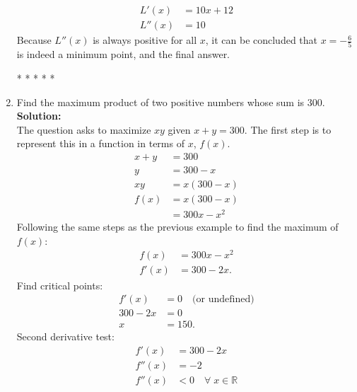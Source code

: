 \documentclass[12pt]{article}
\begin{document}
\begin{enumerate}
\begin{align*}
                        L'(x) &= 10x + 12 \\
                        L''(x) &= 10
                    \end{align*}
                    Because $L''(x)$ is always positive for all $x$, it can be concluded that $x=-\frac{6}{5}$ is indeed a minimum point, and the final answer.
                    \begin{center}
                        * * * * *
                    \end{center}
                \item Find the maximum product of two positive numbers whose sum is $300$.
                \newline \newline
                    \textbf{Solution:}
                    \\ The question asks to maximize $xy$ given $x+y=300$. The first step is to represent this in a function in terms of $x$, $f(x)$.
                    \begin{align*}
                        x+y &= 300 \\
                        y &= 300 - x \\
                        xy &= x(300-x) \\
                        f(x) &= x(300-x) \\
                        &= 300x - x^2
                    \end{align*}
                    Following the same steps as the previous example to find the maximum of $f(x)$:
                    \begin{align*}
                        f(x) &= 300x - x^2 \\
                        f'(x) &= 300 - 2x.
                    \end{align*}
                    Find critical points:
                    \begin{align*}
                        f'(x) &= 0 \quad \text{(or undefined)} \\
                        300 - 2x & = 0 \\
                        x &= 150.
                    \end{align*}
                    Second derivative test:
                    \begin{align*}
                        f'(x) &= 300 - 2x \\
                        f''(x) &= -2 \\
                        f''(x) &< 0 \quad \forall \; x \in \mathbb{R}

\end{align*}
\end{enumerate}
\end{document}
